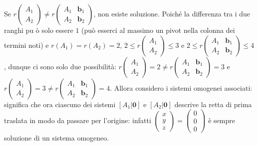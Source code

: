 \documentclass{article}
\begin{document}
Se $r\left( 
\begin{array}{c}
A_{1} \\ 
A_{2}%
\end{array}%
\right) \neq r\left( 
\begin{array}{cc}
A_{1} & \mathbf{b}_{1} \\ 
A_{2} & \mathbf{b}_{2}%
\end{array}%
\right) $, non esiste soluzione. Poich\'{e} la differenza tra i due ranghi pu%
\`{o} solo essere $1$ (pu\`{o} esserci al massimo un pivot nella colonna dei
termini noti) e $r\left( A_{1}\right) =r\left( A_{2}\right) =2$, $2\leq
r\left( 
\begin{array}{c}
A_{1} \\ 
A_{2}%
\end{array}%
\right) \leq 3$ e $2\leq r\left( 
\begin{array}{cc}
A_{1} & \mathbf{b}_{1} \\ 
A_{2} & \mathbf{b}_{2}%
\end{array}%
\right) \leq 4$, dunque ci sono solo due possibilit\`{a}: $r\left( 
\begin{array}{c}
A_{1} \\ 
A_{2}%
\end{array}%
\right) =2\neq r\left( 
\begin{array}{cc}
A_{1} & \mathbf{b}_{1} \\ 
A_{2} & \mathbf{b}_{2}%
\end{array}%
\right) =3$ e $r\left( 
\begin{array}{c}
A_{1} \\ 
A_{2}%
\end{array}%
\right) =3\neq r\left( 
\begin{array}{cc}
A_{1} & \mathbf{b}_{1} \\ 
A_{2} & \mathbf{b}_{2}%
\end{array}%
\right) =4$. Allora considero i sistemi omogenei associati: significa che
ora ciascuno dei sistemi $\left[ A_{1}|\mathbf{0}\right] $ e $\left[ A_{2}|%
\mathbf{0}\right] $ descrive la retta di prima traslata in modo da passare
per l'origine: infatti $\left( 
\begin{array}{c}
x \\ 
y \\ 
z%
\end{array}%
\right) =\left( 
\begin{array}{c}
0 \\ 
0 \\ 
0%
\end{array}%
\right) $ \`{e} sempre soluzione di un sistema omogeneo.
\end{document}
